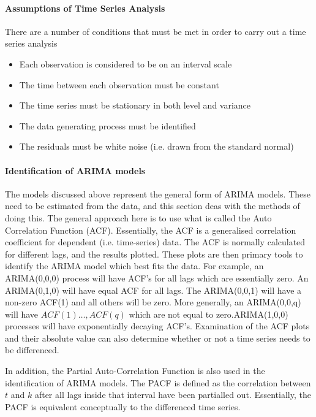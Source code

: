\paragraph{Assumptions of Time Series Analysis}

There are a number of conditions that must be met in order to carry out a time series analysis
\begin{itemize}
\item Each observation is considered to be on an interval scale
\item The time between each observation must be constant
\item  The time series must be stationary in both level and variance
\item  The data generating process must be identified
\item  The residuals must be white noise (i.e. drawn from the standard normal)
\end{itemize} 

\paragraph{Identification of ARIMA models}

The models discussed above represent the general form of ARIMA models. These need to be estimated from the data, and this section deas with the methods of doing this. The general approach here is to use what is called the Auto Correlation Function (ACF). Essentially, the ACF is a generalised correlation coefficient for dependent (i.e. time-series) data. The ACF is normally calculated for different lags, and the results plotted. These plots are then primary tools to identify the ARIMA model which best fits the data. For example, an ARIMA(0,0,0) process will have ACF's for all lags which are essentially zero. An ARIMA(0,1,0) will have equal ACF for all lags. The ARIMA(0,0,1) will have a non-zero ACF(1) and all others will be zero. More generally, an ARIMA(0,0,q) will have $ACF(1)\ldots, ACF(q)$ which are not equal to zero.ARIMA(1,0,0) processes will have exponentially decaying ACF's. Examination of the ACF plots and their absolute value can also determine whether or not a time series needs to be differenced. 

In addition, the Partial Auto-Correlation Function is also used in the identification of ARIMA models. The PACF is defined as the correlation between $t$ and $k$ after all lags inside that interval have been partialled out. Essentially, the PACF is equivalent conceptually to the differenced time series. 


